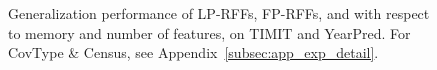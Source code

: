 \begin{figure}
\begin{small}
\begin{tabular}{@{\hskip -0.05in}c@{\hskip -0.1in}c@{\hskip -0.1in}c@{\hskip -0.05in}}
	\end{tabular}
	\end{small}
	\caption{Generalization performance of LP-RFFs, FP-RFFs, and \Nystrom with respect to memory and number of features, on TIMIT and YearPred.  For CovType \& Census, see Appendix~\ref{subsec:app_exp_detail}.
}
	\label{fig:generalization_col}
\end{figure}


